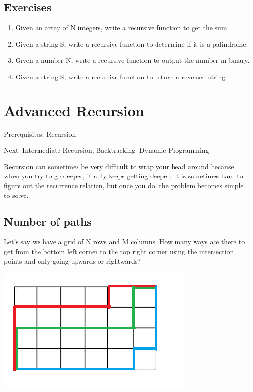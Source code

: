 \documentclass[11pt,oneside]{book}
\makeatletter
\def\maxwidth#1{\ifdim\Gin@nat@width>#1 #1\else\Gin@nat@width\fi}
\makeatother
\begin{document}
\subsection{Exercises}

\begin{enumerate}
\item Given an array of N integers, write a recursive function to get the sum
\item Given a string S, write a recursive function to determine if it is a palindrome.
\item Given a number N, write a recursive function to output the number in binary.
\item Given a string S, write a recursive function to return a reversed string
\end{enumerate}

        \section{ Advanced Recursion }
        

Prerequisites: Recursion

Next: Intermediate Recursion, Backtracking, Dynamic Programming

Recursion can sometimes be very difficult to wrap your head around because when you try to go deeper, it only keeps getting deeper. It is sometimes hard to figure out the recurrence relation, but once you do, the problem becomes simple to solve.

\subsection{Number of paths}

Let's say we have a grid of N rows and M columns. How many ways are there to get from the bottom left corner to the top right corner using the intersection points and only going upwards or rightwards?

\includegraphics[width=\maxwidth{\textwidth}]{recursion_grid.png}
\end{document}
